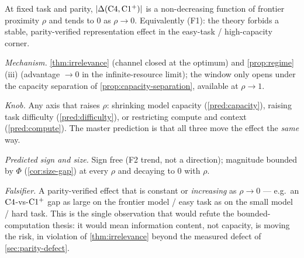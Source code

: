 \begin{prediction}
\label{pred:frontier}
At fixed task and parity, $|\Delta(\mathrm{C}4,\mathrm{C1^{+}})|$ is a
non-decreasing function of frontier proximity $\rho$ and tends to $0$ as
$\rho\to 0$. Equivalently (F1): the theory forbids a stable, parity-verified
representation effect in the easy-task / high-capacity corner.\par
\emph{Mechanism.} \cref{thm:irrelevance} (channel closed at the optimum) and
\cref{prop:regime}(iii) (advantage $\to 0$ in the infinite-resource limit); the
window only opens under the capacity separation of
\cref{prop:capacity-separation}, available at $\rho\to 1$.\par
\emph{Knob.} Any axis that raises $\rho$: shrinking model capacity
(\cref{pred:capacity}), raising task difficulty (\cref{pred:difficulty}), or
restricting compute and context (\cref{pred:compute}). The master prediction is
that all three move the effect the \emph{same} way.\par
\emph{Predicted sign and size.} Sign free (F2 trend, not a direction);
magnitude bounded by $\Phi$ (\cref{cor:size-gap}) at every $\rho$ and decaying
to $0$ with $\rho$.\par
\emph{Falsifier.} A parity-verified effect that is constant or \emph{increasing}
as $\rho\to 0$ --- e.g.\ an $\mathrm{C}4$-vs-$\mathrm{C1^{+}}$ gap as large on the
frontier model / easy task as on the small model / hard task. This is the single
observation that would refute the bounded-computation thesis: it
would mean information content, not capacity, is moving the risk, in violation of
\cref{thm:irrelevance} beyond the measured defect of \cref{sec:parity-defect}.
\end{prediction}

